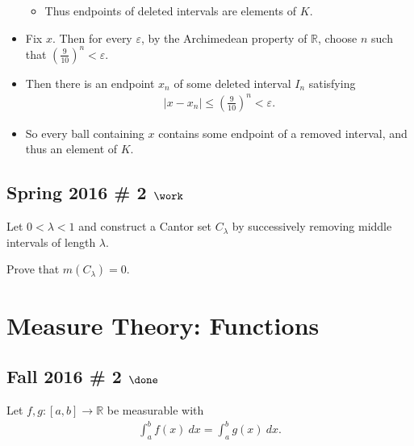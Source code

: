 \begin{solution}
\begin{itemize}
  \begin{itemize}
  \tightlist
  \item
    Thus endpoints of deleted intervals are elements of \(K\).
  \end{itemize}
\item
  Fix \(x\). Then for every \(\varepsilon\), by the Archimedean property
  of \({\mathbb{R}}\), choose \(n\) such that
  \(\left( \frac 9 {10} \right)^n < \varepsilon\).
\item
  Then there is an endpoint \(x_n\) of some deleted interval \(I_n\)
  satisfying
  \begin{align*}{\left\lvert {x - x_n} \right\rvert} \leq  \left( \frac 9 {10} \right)^n < \varepsilon.\end{align*}
\item
  So every ball containing \(x\) contains some endpoint of a removed
  interval, and thus an element of \(K\).
\end{itemize}

\end{solution}

\hypertarget{spring-2016-2-work}{%
\subsection{\texorpdfstring{Spring 2016 \# 2
\(\work\)}{Spring 2016 \# 2 \textbackslash work}}\label{spring-2016-2-work}}

Let \(0 < \lambda < 1\) and construct a Cantor set \(C_\lambda\) by
successively removing middle intervals of length \(\lambda\).

Prove that \(m(C_\lambda) = 0\).

\hypertarget{measure-theory-functions}{%
\section{Measure Theory: Functions}\label{measure-theory-functions}}

\hypertarget{fall-2016-2-done}{%
\subsection{\texorpdfstring{Fall 2016 \# 2
\(\done\)}{Fall 2016 \# 2 \textbackslash done}}\label{fall-2016-2-done}}

Let \(f, g: [a, b] \to {\mathbb{R}}\) be measurable with
\begin{align*}
\int_{a}^{b} f(x) ~d x=\int_{a}^{b} g(x) ~d x.
\end{align*}


